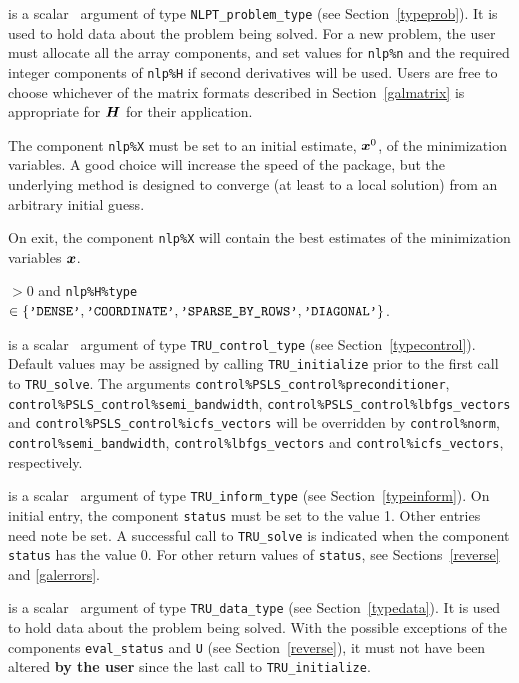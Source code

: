 \documentclass{galahad}
\newcommand{\packagename}{TRU}
\begin{document}
\vspace*{-2mm}
\begin{description}
 is a scalar \intentinout\ argument of type
{\tt NLPT\_problem\_type}
(see Section~\ref{typeprob}).
It is used to hold data about the problem being solved.
For a new problem, the user must allocate all the array components,
and set values for {\tt nlp\%n}
and the required integer components of {\tt nlp\%H} if second derivatives
will be used.
Users are free to choose whichever
of the matrix formats described in Section~\ref{galmatrix}
is appropriate for ${\bm{H}}$ for their application.

\noindent
The component {\tt nlp\%X} must be set to an initial estimate, ${\bm{x}}^{0}$,
of the minimization variables. A good choice will increase the speed
of the package, but the underlying method is designed to converge (at least
to a local solution) from an arbitrary initial guess.

\noindent
On exit, the component {\tt nlp\%X} will contain the best estimates of the
minimization variables ${\bm{x}}$.

\noindent
{} $> 0$ and
{\tt nlp\%H\%type} $\in \{
  \mbox{\tt 'DENSE'}, \mbox{\tt 'COORDINATE'}, \mbox{\tt 'SPARSE\_BY\_ROWS'},
  \mbox{\tt 'DIAGONAL'} \}$.

 is a scalar \intentin\ argument of type
{\tt \packagename\_control\_type}
(see Section~\ref{typecontrol}). Default values may be assigned by calling
{\tt \packagename\_initialize} prior to the first call to
{\tt \packagename\_solve}. The arguments
{\tt control\%PSLS\_control\-\%preconditioner},
{\tt control\%PSLS\_control\%semi\_bandwidth},
{\tt control\%PSLS\_control\%lbfgs\_vectors} and
{\tt control\%PSLS\_control\%icfs\_vectors}
will be overridden by
{\tt control\%norm},
{\tt control\%semi\_bandwidth},
{\tt control\%lbfgs\_vectors} and
{\tt control\%icfs\_vectors}, respectively.

 is a scalar \intentinout\ argument of type
{\tt \packagename\_inform\_type}
(see Section~\ref{typeinform}).
On initial entry, the  component {\tt status} must be set to the value 1.
Other entries need note be set.
A successful call to
{\tt \packagename\_solve}
is indicated when the  component {\tt status} has the value 0.
For other return values of {\tt status}, see Sections~\ref{reverse} and
\ref{galerrors}.

 is a scalar \intentinout\ argument of type
{\tt \packagename\_data\_type}
(see Section~\ref{typedata}). It is used to hold data about the problem being
solved. With the possible exceptions of the components
{\tt eval\_status} and {\tt U} (see Section~\ref{reverse}),
it must not have been altered {\bf by the user} since the last call to
{\tt \packagename\_initialize}.


\end{description}
\end{document}
